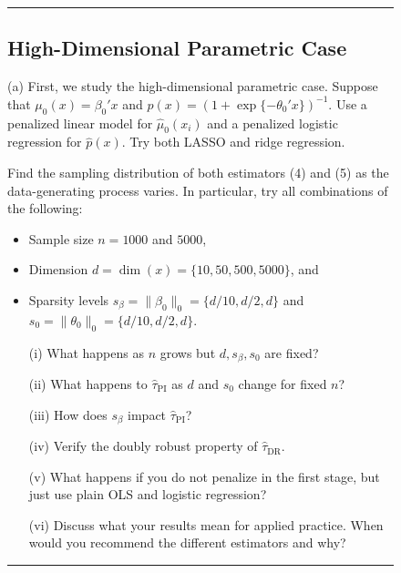 \documentclass{article}
\newenvironment{colorparagraph}[1]{\par\color{#1}}{\par}
\begin{document}
\begin{figure}[H]
  \begin{colorparagraph}{questioncolor}
  \rule{\textwidth}{0.5pt}
  \label{q2a}
  \subsection{High-Dimensional Parametric Case}

  (a) First, we study the high-dimensional parametric case. Suppose that \( \mu_0(x) = \beta_0' x \) and \( p(x) = (1 + \exp\{-\theta_0' x\})^{-1} \). Use a penalized linear model for \( \hat{\mu}_0(x_i) \) and a penalized logistic regression for \( \hat{p}(x) \). Try both LASSO and ridge regression.

  Find the sampling distribution of both estimators (4) and (5) as the data-generating process varies. In particular, try all combinations of the following:
  
  \begin{itemize}
      \item Sample size \( n = 1000 \) and \( 5000 \),
      \item Dimension \( d = \dim(x) = \{10, 50, 500, 5000\} \), and
      \item Sparsity levels \( s_\beta = \| \beta_0 \|_0 = \{d / 10, d / 2, d\} \) and \( s_0 = \| \theta_0 \|_0 = \{d / 10, d / 2, d\} \).
  \end{itemize}

  \begin{itemize}
      \item[(i)] What happens as \( n \) grows but \( d, s_\beta, s_0 \) are fixed?
      \item[(ii)] What happens to \( \hat{\tau}_{\text{PI}} \) as \( d \) and \( s_0 \) change for fixed \( n \)?
      \item[(iii)] How does \( s_\beta \) impact \( \hat{\tau}_{\text{PI}} \)?
      \item[(iv)] Verify the doubly robust property of \( \hat{\tau}_{\text{DR}} \).
      \item[(v)] What happens if you do not penalize in the first stage, but just use plain OLS and logistic regression?
      \item[(vi)] Discuss what your results mean for applied practice. When would you recommend the different estimators and why?
  \end{itemize}
  \rule{\textwidth}{0.5pt}
  \end{colorparagraph}  
\end{figure}
\end{document}

